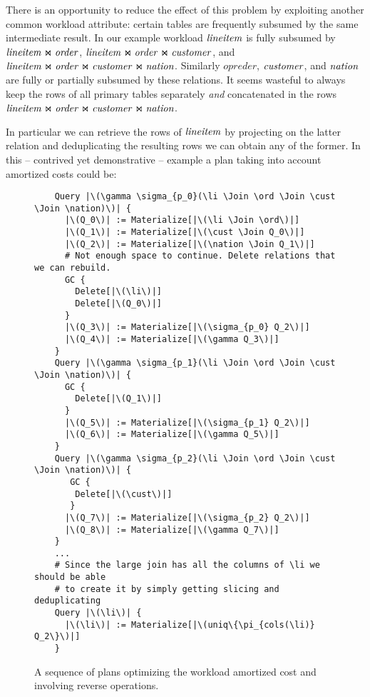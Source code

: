 There is an opportunity to reduce the effect of this problem by
exploiting another common workload attribute: certain tables are
frequently subsumed by the same intermediate result. In our example
workload \(\mathit{lineitem}\) is fully subsumed by \(\mathit{lineitem} \Join \mathit{order}\),
\(\mathit{lineitem} \Join \mathit{order} \Join \mathit{customer}\), and
\(\mathit{lineitem} \Join \mathit{order} \Join \mathit{customer} \Join \mathit{nation}\). Similarly \(opreder\),
\(\mathit{customer}\), and \(\mathit{nation}\) are fully or partially subsumed by these
relations. It seems wasteful to always keep the rows of all primary
tables separately \emph{and} concatenated in the rows
\(\mathit{lineitem} \Join \mathit{order} \Join \mathit{customer} \Join \mathit{nation}\).

In particular we can retrieve the rows of \(\mathit{lineitem}\) by projecting
on the latter relation and deduplicating the resulting rows we can
obtain any of the former. In this -- contrived yet demonstrative --
example a plan taking into account amortized costs could be:

\begin{figure}[H]
\begin{verbatim}
    Query |\(\gamma \sigma_{p_0}(\li \Join \ord \Join \cust \Join \nation)\)| {
      |\(Q_0\)| := Materialize[|\(\li \Join \ord\)|]
      |\(Q_1\)| := Materialize[|\(\cust \Join Q_0\)|]
      |\(Q_2\)| := Materialize[|\(\nation \Join Q_1\)|]
      # Not enough space to continue. Delete relations that we can rebuild.
      GC {
        Delete[|\(\li\)|]
        Delete[|\(Q_0\)|]
      }
      |\(Q_3\)| := Materialize[|\(\sigma_{p_0} Q_2\)|]
      |\(Q_4\)| := Materialize[|\(\gamma Q_3\)|]
    }
    Query |\(\gamma \sigma_{p_1}(\li \Join \ord \Join \cust \Join \nation)\)| {
      GC {
        Delete[|\(Q_1\)|]
      }
      |\(Q_5\)| := Materialize[|\(\sigma_{p_1} Q_2\)|]
      |\(Q_6\)| := Materialize[|\(\gamma Q_5\)|]
    }
    Query |\(\gamma \sigma_{p_2}(\li \Join \ord \Join \cust \Join \nation)\)| {
       GC {
        Delete[|\(\cust\)|]
       }
      |\(Q_7\)| := Materialize[|\(\sigma_{p_2} Q_2\)|]
      |\(Q_8\)| := Materialize[|\(\gamma Q_7\)|]
    }
    ...
    # Since the large join has all the columns of \li we should be able
    # to create it by simply getting slicing and deduplicating
    Query |\(\li\)| {
      |\(\li\)| := Materialize[|\(uniq\{\pi_{cols(\li)} Q_2\}\)|]
    }
\end{verbatim}
  \caption{\label{fig:amortized_plan}A sequence of plans optimizing
    the workload amortized cost and involving reverse operations.}
\end{figure}

